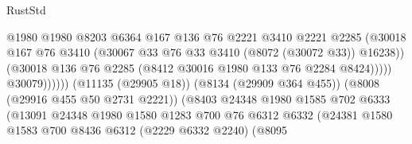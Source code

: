 \begin{lexlean}{RustStd}
\begin{coremodule}
                                              @1980
                                              @1980
                                              @8203
                                              @6364
                                              @167
                                              @136
                                              @76
                                              @2221
                                              @3410
                                              @2221
                                              @2285
                                              (@30018
                                                @167
                                                @76
                                                @3410
                                                (@30067
                                                  @33
                                                  @76
                                                  @33
                                                  @3410
                                                  (@8072 (@30072 @33))
                                                  @16238))
                                              (@30018
                                                @136
                                                @76
                                                @2285
                                                (@8412 @30016 @1980 @133 @76 @2284 @8424)))))
                                        @30079))))))
                            (@11135 (@29905 @18))
                            (@8134 (@29909 @364 @455))
                            (@8008 (@29916 @455 @50 @2731 @2221))
                            (@8403
                              @24348
                              @1980
                              @1585
                              @702
                              @6333
                              (@13091
                                @24348
                                @1980
                                @1580
                                @1283
                                @700
                                @76
                                @6312
                                @6332
                                (@24381
                                  @1580
                                  @1583
                                  @700
                                  @8436
                                  @6312
                                  (@2229 @6332 @2240)
                                  (@8095

\end{coremodule}
\end{lexlean}
